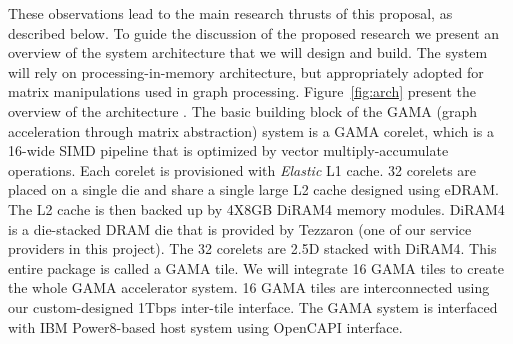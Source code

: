 These observations lead to the main research thrusts of this proposal, as described below. To guide the discussion of the proposed research we present an overview of the system architecture that we will design and build. The system will rely on processing-in-memory architecture, but appropriately adopted for matrix manipulations used in graph processing. Figure~\ref{fig:arch} present the overview of the architecture . The basic building block of the GAMA (graph acceleration through matrix abstraction) system is a GAMA corelet, which is a 16-wide SIMD pipeline that is optimized by vector multiply-accumulate operations. Each corelet is provisioned with \emph{Elastic} L1 cache.  32 corelets are placed on a single die and share a single large L2 cache designed using eDRAM. The L2 cache is then backed up by 4X8GB DiRAM4 memory modules. DiRAM4 is a die-stacked DRAM die that is provided by Tezzaron (one of our service providers in this project). The 32 corelets are 2.5D stacked with DiRAM4. This entire package is called a GAMA tile. We will integrate 16 GAMA tiles to create the whole GAMA accelerator system. 16 GAMA tiles are interconnected  using our custom-designed 1Tbps inter-tile interface. The GAMA system is interfaced with IBM Power8-based host system using OpenCAPI interface. 

